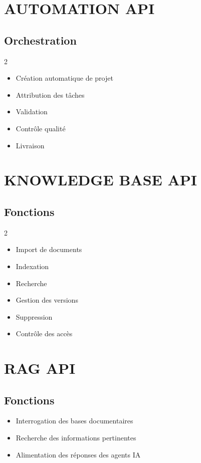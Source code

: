 \documentclass[12pt,a4paper,oneside]{book}
\begin{document}
\chapter{AUTOMATION API}

\section{Orchestration}
\begin{multicols}{2}
\begin{itemize}
\item Création automatique de projet
\item Attribution des tâches
\item Validation
\item Contrôle qualité
\item Livraison
\end{itemize}
\end{multicols}

\chapter{KNOWLEDGE BASE API}

\section{Fonctions}
\begin{multicols}{2}
\begin{itemize}
\item Import de documents
\item Indexation
\item Recherche
\item Gestion des versions
\item Suppression
\item Contrôle des accès
\end{itemize}
\end{multicols}

\chapter{RAG API}

\section{Fonctions}
\begin{itemize}
\item Interrogation des bases documentaires
\item Recherche des informations pertinentes
\item Alimentation des réponses des agents IA
\end{itemize}
\end{document}

